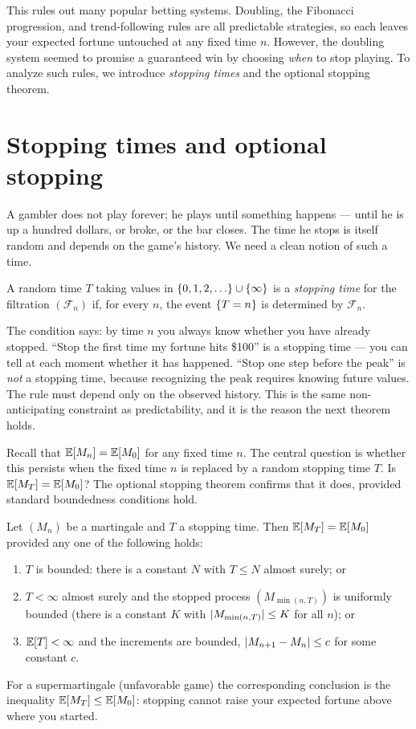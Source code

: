 This rules out many popular betting systems. Doubling, the Fibonacci progression, and trend-following
rules are all predictable strategies, so each leaves your expected fortune untouched at any fixed time $n$.
However, the doubling system seemed to promise a guaranteed win by choosing \emph{when} to stop playing.
To analyze such rules, we introduce \emph{stopping times} and the optional stopping theorem.

\section{Stopping times and optional stopping}
\label{ch28:optional-stopping}

A gambler does not play forever; he plays until something happens --- until he is up a hundred dollars,
or broke, or the bar closes. The time he stops is itself random and depends on the game's history. We
need a clean notion of such a time.

\begin{definition}
\label{ch28:def-stopping}
A random time $T$ taking values in $\set{0,1,2,\dots} \cup \set{\infty}$ is a \emph{stopping time} for
the filtration $(\mathcal{F}_n)$ if, for every $n$, the event $\{T = n\}$ is determined by
$\mathcal{F}_n$.
\end{definition}

The condition says: by time $n$ you always know whether you have already stopped. ``Stop the
first time my fortune hits \$100'' is a stopping time --- you can tell at each moment whether it has
happened. ``Stop one step before the peak'' is \emph{not} a stopping time, because recognizing the peak
requires knowing future values. The rule must depend only on the observed history. This is
the same non-anticipating constraint as predictability, and it is the reason the next theorem holds.

Recall that $\operatorname{\mathbb{E}}[M_n] = \operatorname{\mathbb{E}}[M_0]$ for any fixed time $n$. The central question is whether this
persists when the fixed time $n$ is replaced by a random stopping time $T$. Is $\operatorname{\mathbb{E}}[M_T] = \operatorname{\mathbb{E}}[M_0]$?
The optional stopping theorem confirms that it does, provided standard boundedness conditions hold.

\begin{theorem}
\label{ch28:thm-ost}
Let $(M_n)$ be a martingale and $T$ a stopping time. Then $\operatorname{\mathbb{E}}[M_T] = \operatorname{\mathbb{E}}[M_0]$ provided any one of the
following holds:
\begin{enumerate}
\item $T$ is bounded: there is a constant $N$ with $T \le N$ almost surely; or
\item $T < \infty$ almost surely and the stopped process $(M_{\min(n,T)})$ is uniformly bounded
      (there is a constant $K$ with $\lvert M_{\min(n,T)}\rvert \le K$ for all $n$); or
\item $\operatorname{\mathbb{E}}[T] < \infty$ and the increments are bounded, $\lvert M_{n+1} - M_n\rvert \le c$ for some constant
      $c$.
\end{enumerate}
For a supermartingale (unfavorable game) the corresponding conclusion is the inequality
$\operatorname{\mathbb{E}}[M_T] \le \operatorname{\mathbb{E}}[M_0]$: stopping cannot raise your expected fortune above where you started.
\end{theorem}

